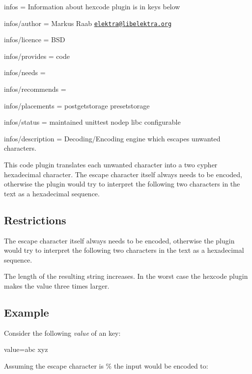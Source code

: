 
\begin{DoxyItemize}
\item infos = Information about hexcode plugin is in keys below
\item infos/author = Markus Raab \href{mailto:elektra@libelektra.org}{\tt elektra@libelektra.\+org}
\item infos/licence = B\+SD
\item infos/provides = code
\item infos/needs =
\item infos/recommends =
\item infos/placements = postgetstorage presetstorage
\item infos/status = maintained unittest nodep libc configurable
\item infos/description = Decoding/\+Encoding engine which escapes unwanted characters.
\end{DoxyItemize}

This code plugin translates each unwanted character into a two cypher hexadecimal character. The escape character itself always needs to be encoded, otherwise the plugin would try to interpret the following two characters in the text as a hexadecimal sequence.

\subsection*{Restrictions}


\begin{DoxyItemize}
\item The escape character itself always needs to be encoded, otherwise the plugin would try to interpret the following two characters in the text as a hexadecimal sequence.
\item The length of the resulting string increases. In the worst case the hexcode plugin makes the value three times larger.
\end{DoxyItemize}

\subsection*{Example}

Consider the following {\itshape value} of an key\+:


\begin{DoxyCode}
value=abc xyz
\end{DoxyCode}


Assuming the escape character is \% the input would be encoded to\+:


